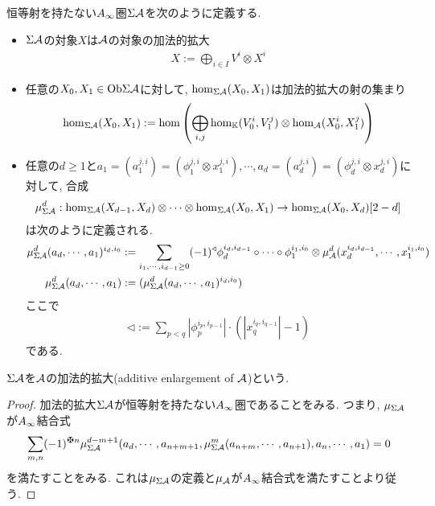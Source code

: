 \documentclass[uplatex, a4paper, 14Q, dvipdfmx]{jsarticle}
\begin{document}
\begin{definition}
  恒等射を持たない$A_{\infty}$圏$\Sigma\mathcal{A}$を次のように定義する. 
  \begin{itemize}
    \item $\Sigma\mathcal{A}$の対象$X$は$\mathcal{A}$の対象の加法的拡大
    \begin{align*}
      X := \bigoplus_{i \in I} V^i \otimes X^i
    \end{align*}
    \item 任意の$X_0,X_1 \in \mathrm{Ob}\Sigma\mathcal{A}$に対して, $\hom_{\Sigma\mathcal{A}}(X_0,X_1)$は加法的拡大の射の集まり
    \begin{align*}
      \hom_{\Sigma\mathcal{A}}(X_0,X_1)
      := \hom \qty(\bigoplus_{i,j} \hom_{\mathbb{K}}(V_0^i,V_1^j) \otimes \hom_{\mathcal{A}}(X_0^i,X_1^j))
    \end{align*}
    \item 任意の$d \geq 1$と$a_1 = (a_1^{j,i}) = (\phi_1^{j,i} \otimes x_1^{j,i}), \cdots, a_d = (a_d^{j,i}) = (\phi_d^{j,i} \otimes x_d^{j,i})$に対して, 合成
    \begin{align*}
      \mu^d_{\Sigma\mathcal{A}} : \hom_{\Sigma\mathcal{A}}(X_{d-1},X_d) \otimes \cdots \otimes \hom_{\Sigma\mathcal{A}}(X_0,X_1) \to \hom_{\Sigma\mathcal{A}}(X_0,X_d)[2-d]
    \end{align*}
    は次のように定義される. 
    \begin{align*}
      \mu^d_{\Sigma\mathcal{A}}(a_d,\cdots,a_1)^{i_d,i_0} 
      &:= \sum_{i_1,\cdots,i_{d-1} \geq 0} (-1)^\triangleleft 
      \phi_d^{i_d,i_{d-1}} \circ  \cdots \circ \phi_1^{i_1,i_0} \otimes \mu^d_{\mathcal{A}}(x_d^{i_d,i_{d-1}}, \cdots, x_1^{i_1,i_0}) \\
      \mu^d_{\Sigma\mathcal{A}}(a_d,\cdots,a_1) 
      &:= (\mu^d_{\Sigma\mathcal{A}}(a_d,\cdots,a_1)^{i_d,i_0})
    \end{align*}
    ここで
    \begin{align*}
      \triangleleft 
      := \sum_{p < q} |\phi_p^{i_p,i_{p-1}}| \cdot (|x_q^{i_q,i_{q-1}}|-1)
    \end{align*}
    である. 
  \end{itemize}
  $\Sigma\mathcal{A}$を$\mathcal{A}$の加法的拡大(additive enlargement of $\mathcal{A}$)という. 
\end{definition}

\begin{proof}
  加法的拡大$\Sigma\mathcal{A}$が恒等射を持たない$A_{\infty}$圏であることをみる.
  つまり, $\mu_{\Sigma\mathcal{A}}$が$A_{\infty}$結合式 
  \begin{align*}
    \sum_{m,n} (-1)^{\maltese n} \mu^{d-m+1}_{\Sigma\A}(a_d,\cdots,a_{n+m+1}, \mu^m_{\Sigma\A}(a_{n+m},\cdots,a_{n+1}), a_n,\cdots,a_1)
    = 0
  \end{align*}
  を満たすことをみる.
  これは$\mu_{\Sigma\mathcal{A}}$の定義と$\mu_{\mathcal{A}}$が$A_{\infty}$結合式を満たすことより従う.
\end{proof}
\end{document}
